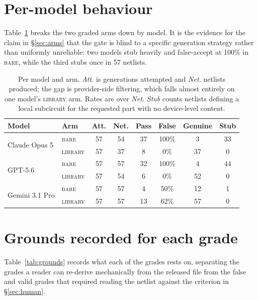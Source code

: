 \section{Per-model behaviour}
\label{app:permodel}

Table~\ref{tab:permodel} breaks the two graded arms down by model. It is the
evidence for the claim in \S\ref{sec:arms} that the gate is blind to a
specific generation strategy rather than uniformly unreliable: two models
stub heavily and false-accept at 100\% in \textsc{bare}, while the third
stubs once in 57 netlists.

\begin{table}[!ht]
\centering
\caption{Per model and arm. \emph{Att.} is generations attempted and
  \emph{Net.} netlists produced; the gap is provider-side filtering, which falls
  almost entirely on one model's \textsc{library} arm. Rates are over
  \emph{Net.} \emph{Stub} counts netlists defining a local subcircuit for the
  requested part with no device-level content.}
\label{tab:permodel}
\small
\setlength{\tabcolsep}{4pt}
\begin{tabular}{@{}llcccccc@{}}
\toprule
\textbf{Model} & \textbf{Arm} & \textbf{Att.} & \textbf{Net.} & \textbf{Pass} &
  \textbf{False} & \textbf{Genuine} & \textbf{Stub} \\
\midrule
\multirow{2}{*}{Claude Opus 5}
  & \textsc{bare}    & 57 & 54 & 37 & 100\% & 3  & 33 \\
  & \textsc{library} & 57 & 37 &  8 &   0\% & 37 &  0 \\
\multirow{2}{*}{GPT-5.6}
  & \textsc{bare}    & 57 & 57 & 32 & 100\% & 4  & 44 \\
  & \textsc{library} & 57 & 54 &  6 &   0\% & 52 &  0 \\
\multirow{2}{*}{Gemini 3.1 Pro}
  & \textsc{bare}    & 57 & 57 &  4 &  50\% & 12 &  1 \\
  & \textsc{library} & 57 & 57 & 13 &  62\% & 57 &  0 \\
\bottomrule
\end{tabular}
\end{table}

\section{Grounds recorded for each grade}
\label{app:grounds}

Table~\ref{tab:grounds} records what each of the \NumNumericPass{} grades
rests on, separating the \ConfTP{} grades a reader can re-derive mechanically
from the released file from the \GroundsFakeRead{} false and
\GroundsValidRead{} valid grades that required reading the netlist against the
criterion in \S\ref{sec:human}.


